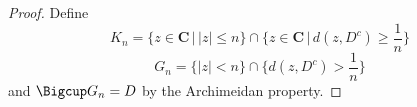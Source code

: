 \vspace{2ex}
\begin{proof}
Define 
\[K_{n}=\Big\{z\in {\bm C} \,\big|\, |z|\leq n\Big\}\cap \Big\{z\in {\bm C} \,\big|\,d(z,D^{c})\geq \dfrac{1}{n} \Big\}\]
\[G_{n}=\Big\{|z|<n \Big\}\cap \Big\{d(z,D^{c})>\dfrac{1}{n}\Big\}\]
and $\Bigcup G_{n}=D$ by the Archimeidan property.
\end{proof}
\vspace{2ex}


